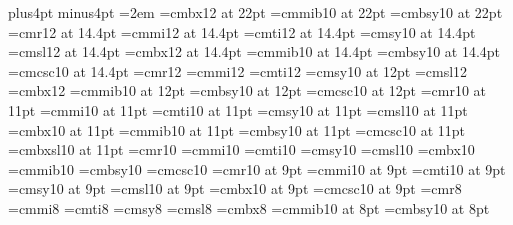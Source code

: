 \hsize=6.5in
\vsize=9in
\hoffset=0in
\voffset=0in
\bigskipamount=12pt plus4pt minus4pt
\parskip=0pt
\parindent=2em
\def\raggedcenter{\leftskip=0pt plus6em \rightskip=\leftskip
   \parfillskip=0pt \spaceskip=.3333em \xspaceskip=.5em
   \pretolerance=9999 \tolerance=9999
   \hyphenpenalty=9999 \exhyphenpenalty=9999} 
\def\red{\special{color rgb 1.0 0 0}}
\def\green{\special{color cmyk 1.0 0 1.0 .5}}
\def\blue{\special{color rgb 0 0 1.0}}
\def\magenta{\special{color cmyk 0 1.0 0 0}}
\def\maroon{\special{color cmyk 0 0.87 0.68 0.32}}
\def\black{\special{color cmyk 0 0 0 1.0}}
%
\font\twentytwobf=cmbx12 at 22pt
\font\twentytwobi=cmmib10 at 22pt
\font\twentytwobsy=cmbsy10 at 22pt
%
\font\fourteenrm=cmr12 at 14.4pt 
\font\fourteeni=cmmi12 at 14.4pt 
\font\fourteenit=cmti12 at 14.4pt
\font\fourteensy=cmsy10 at 14.4pt
\font\fourteensl=cmsl12 at 14.4pt
\font\fourteenbf=cmbx12 at 14.4pt
\font\fourteenbi=cmmib10 at 14.4pt
\font\fourteenbsy=cmbsy10 at 14.4pt
\font\fourteencsc=cmcsc10 at 14.4pt
%
\font\twelverm=cmr12
\font\twelvei=cmmi12
\font\twelveit=cmti12
\font\twelvesy=cmsy10 at 12pt
\font\twelvesl=cmsl12  
\font\twelvebf=cmbx12
\font\twelvebi=cmmib10 at 12pt 
\font\twelvebsy=cmbsy10 at 12pt 
\font\twelvecsc=cmcsc10 at 12pt 
%
\font\elevenrm=cmr10 at 11pt
\font\eleveni=cmmi10 at 11pt
\font\elevenit=cmti10 at 11pt
\font\elevensy=cmsy10 at 11pt
\font\elevensl=cmsl10 at 11pt
\font\elevenbf=cmbx10 at 11pt
\font\elevenbi=cmmib10 at 11pt
\font\elevenbsy=cmbsy10 at 11pt
\font\elevencsc=cmcsc10 at 11pt
%
\font\elevenbfi=cmbxsl10 at 11pt  %
%
\font\tenrm=cmr10   
\font\teni=cmmi10   
\font\tenit=cmti10  
\font\tensy=cmsy10  
\font\tensl=cmsl10  
\font\tenbf=cmbx10  
\font\tenbi=cmmib10 
\font\tenbsy=cmbsy10 
\font\tencsc=cmcsc10
%
\font\ninerm=cmr10 at 9pt
\font\ninei=cmmi10 at 9pt
\font\nineit=cmti10 at 9pt
\font\ninesy=cmsy10 at 9pt
\font\ninesl=cmsl10 at 9pt
\font\ninebf=cmbx10 at 9pt
\font\ninecsc=cmcsc10 at 9pt
%
\font\eightrm=cmr8
\font\eighti=cmmi8
\font\eightit=cmti8
\font\eightsy=cmsy8
\font\eightsl=cmsl8
\font\eightbf=cmbx8
\font\eightbi=cmmib10 at 8pt
\font\eightbsy=cmbsy10 at 8pt
